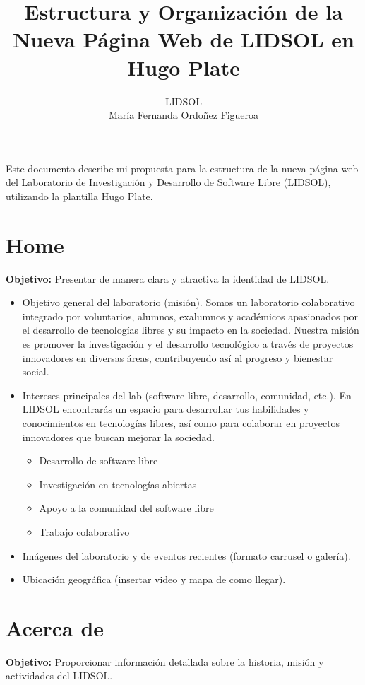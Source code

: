 \documentclass[12pt]{article}
\title{Estructura y Organización de la Nueva Página Web de LIDSOL en Hugo Plate}
\author{LIDSOL \\ María Fernanda Ordoñez Figueroa}
\date{}
\begin{document}
\maketitle

Este documento describe mi propuesta para la estructura de la nueva página web del
Laboratorio de Investigación y Desarrollo de Software Libre (LIDSOL), utilizando la plantilla
Hugo Plate.

\section{Home}
\textbf{Objetivo:} Presentar de manera clara y atractiva la identidad de LIDSOL.
\begin{itemize}[label=--]
    \item Objetivo general del laboratorio (misión).
    Somos un laboratorio colaborativo integrado por voluntarios, alumnos, exalumnos y académicos apasionados por el desarrollo de tecnologías libres y su impacto en la sociedad. Nuestra misión es promover la investigación y el desarrollo tecnológico a través de proyectos innovadores en diversas áreas, contribuyendo así al progreso y bienestar social.
    \item Intereses principales del lab (software libre, desarrollo, comunidad, etc.).
    En LIDSOL encontrarás un espacio para desarrollar tus habilidades y conocimientos en tecnologías libres, así como para colaborar en proyectos innovadores que buscan mejorar la sociedad.
    \begin{itemize}
        \item Desarrollo de software libre
        \item Investigación en tecnologías abiertas
        \item Apoyo a la comunidad del software libre
        \item Trabajo colaborativo
    \end{itemize}
    \item Imágenes del laboratorio y de eventos recientes (formato carrusel o galería).
    \item Ubicación geográfica (insertar video y mapa de como llegar).
\end{itemize}

\section{Acerca de}
\textbf{Objetivo:} Proporcionar información detallada sobre la historia, misión y actividades del LIDSOL.
\end{document}
